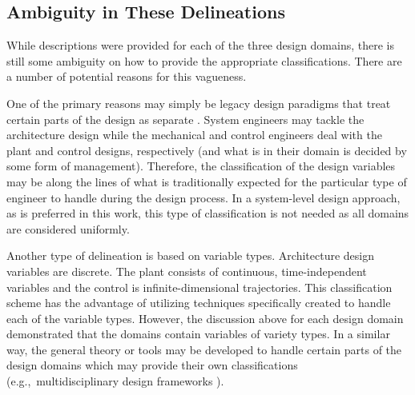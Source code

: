 \subsection{Ambiguity in These Delineations\label{sec:ch1:}}

While descriptions were provided for each of the three design domains, there is still some ambiguity on how to provide the appropriate classifications.
There are a number of potential reasons for this vagueness.

One of the primary reasons may simply be legacy design paradigms that treat certain parts of the design as separate \cite{Allison2014a}.
System engineers may tackle the architecture design while the mechanical and control engineers deal with the plant and control designs, respectively (and what is in their domain is decided by some form of management).
Therefore, the classification of the design variables may be along the lines of what is traditionally expected for the particular type of engineer to handle during the design process.
In a system-level design approach, as is preferred in this work, this type of classification is not needed as all domains are considered uniformly.

Another type of delineation is based on variable types.
Architecture design variables are discrete.
The plant consists of continuous, time-independent variables and the control is infinite-dimensional trajectories.
This classification scheme has the advantage of utilizing techniques specifically created to handle each of the variable types.
However, the discussion above for each design domain demonstrated that the domains contain variables of variety types.
In a similar way, the general theory or tools may be developed to handle certain parts of the design domains which may provide their own classifications (e.g.,~multidisciplinary design frameworks \cite{Allison2014a}).

